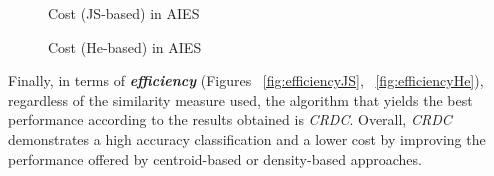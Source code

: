\begin{figure}[!htb]\centering
   \begin{minipage}{0.49\textwidth}
     \caption{Cost (JS-based) in AIES}\label{fig:costJS}
   \end{minipage}
   \begin {minipage}[c]{0.49\textwidth}
     \caption{Cost (He-based) in AIES}\label{fig:costHe}
   \end{minipage}
\end{figure}


Finally, in terms of \textbf{\textit{efficiency}} (Figures ~\ref{fig:efficiencyJS}, ~\ref{fig:efficiencyHe}), regardless of the similarity measure used, the algorithm that yields the best performance according to the results obtained is \textit{CRDC}. Overall, \textit{CRDC} demonstrates a high accuracy classification and a lower cost by improving the performance offered by centroid-based or density-based approaches.

